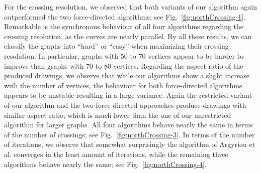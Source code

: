 \documentclass[runningheads]{llncs}
\begin{document}
For the crossing resolution, we observed that both variants of our algorithm again outperformed the two force-directed algorithms; see Fig.~\ref{fig:northCrossing-1}. Remarkable is the synchronous behaviour of all four algorithms regarding the crossing resolution, as the curves are nearly parallel. By all these results, we can classify the graphs into ``hard'' or ``easy'' when maximizing their crossing resolution. In particular, graphs with 50 to 70 vertices appear to be harder to improve than graphs with 70 to 80 vertices. Regarding the aspect ratio of the produced drawings, we observe that while our algorithms show a slight increase with the number of vertices, the behaviour for both force-directed algorithms appears to be unstable resulting in a large variance. Again the restricted variant of our algorithm and the two force directed approaches produce drawings with similar aspect ratio, which is much lower than the one of our unrestricted algorithm for larger graphs. All four algorithms behave nearly the same in terms of the number of crossings; see Fig.~\ref{fig:northCrossing-3}. In terms of the number of iterations, we observe that somewhat surprisingly the algorithm of Argyriou et al. converges in the least amount of iterations, while the remaining three algorithms behave nearly the same; see Fig.~\ref{fig:northCrossing-4}.
\end{document}
